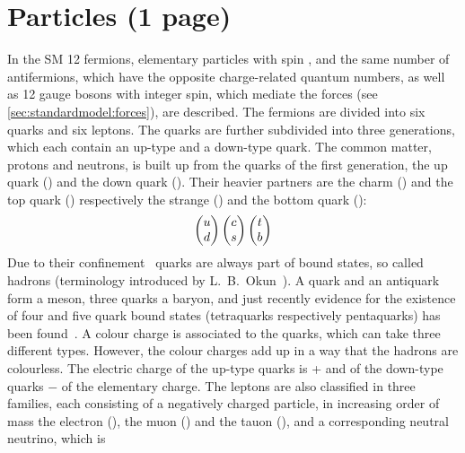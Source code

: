 
\section{Particles (1 page)}
\label{sec:standardmodel:particles}

In the SM 12 fermions, elementary particles with spin , and the
same number of antifermions, which have the opposite charge-related quantum
numbers, as well as 12 gauge bosons with integer spin, which mediate the
forces (see \cref{sec:standardmodel:forces}), are described. The fermions are
divided into six quarks and six leptons. The quarks are further subdivided
into three generations, which each contain an up-type and a down-type quark.
The common matter, protons and neutrons, is built up from the quarks of the
first generation, the up quark (\uquark) and the down quark (\dquark). Their
heavier partners are the charm (\cquark) and the top quark (\tquark)
respectively the strange (\squark) and the bottom quark (\bquark):
\begin{align}
\begin{pmatrix}
{\ensuremath{u}} \\ {d}
\end{pmatrix}
\begin{pmatrix}
{\ensuremath{c}} \\ {s}
\end{pmatrix}
\begin{pmatrix}
{\ensuremath{t}}	\\ {b}
\end{pmatrix}
\end{align}
Due to their confinement~\cite{Confinement} quarks are
always part of bound states, so called hadrons (terminology introduced by
L.~B.~Okun~\cite{Okun:1962kca}). A quark and an antiquark form a meson, three
quarks a baryon, and just recently evidence for the existence of four and five
quark bound states (tetraquarks respectively pentaquarks) has been
found~\cite{LHCb-PAPER-2016-018,*LHCb-PAPER-2016-019,LHCb-PAPER-2015-029,LHCb-PAPER-2016-015}.
A colour charge is associated to the quarks, which can take three different
types. However, the colour charges add up in a way that the hadrons are
colourless. The electric charge of the up-type quarks is + and of
the down-type quarks $-$ of the elementary charge. The leptons are
also classified in three families, each consisting of a negatively charged
particle, in increasing order of mass the electron (\electron), the muon
(\muon) and the tauon (\tauon), and a corresponding neutral neutrino, which is
